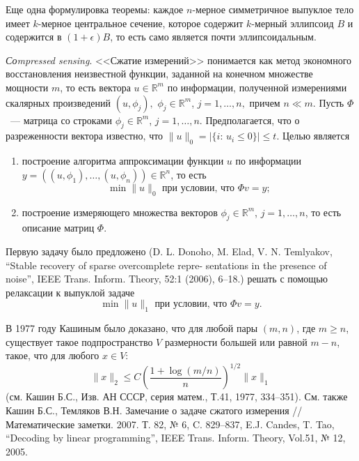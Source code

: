 \begin{remark}
Еще одна формулировка теоремы: каждое $n$-мерное симметричное выпуклое тело имеет $k$-мерное центральное сечение, которое содержит $k$-мерный эллипсоид $B$ и содержится в $(1+\epsilon)B$, то есть само является почти эллипсоидальным.

\medskip

\textit{Соmpressed sensing}. 
<<Сжатие измерений>> понимается как метод экономного восстановления неизвестной функции, заданной на конечном множестве мощности $m$, то есть вектора $u\in\mathbb{R}^m$ по информации, полученной измерениями скалярных произведений $(u,\phi_j),$ $\phi_j\in \mathbb{R}^m$,  $j = 1,\dots,n,$ причем $n\ll m$. Пусть $\Phi$~--- матрица со строками $\phi_j\in\mathbb{R}^m$, $j=1,\dots,n$.
Предполагается, что о разреженности вектора известно, что $\|u\|_{0} = |\{i:\,u_i\leq 0 \}|\leq t.$
Целью является 
\begin{enumerate}
\item построение алгоритма аппроксимации функции $u$ по информации $y = ((u,\phi_1),\dots,(u,\phi_n))\in\mathbb{R}^n$, то есть 
\begin{equation*}\label{lo-pr}
\min\|u\|_{0}\text{ при условии, что } \Phi v = y;
\end{equation*}
\item построение измеряющего множества векторов $\phi_j\in\mathbb{R}^m$, $j=1,\dots,n$, то есть описание матриц $\Phi$.
\end{enumerate}

Первую задачу было предложено (D. L. Donoho, M. Elad, V. N. Temlyakov, “Stable recovery of sparse overcomplete repre- sentations in the presence of noise”, IEEE Trans. Inform. Theory, 52:1 (2006), 6–18.) решать с помощью релаксации к выпуклой задаче 
\begin{equation*}\label{l1-pr}
\min\|u\|_{1}\text{ при условии, что } \Phi v = y.
\end{equation*}

В 1977 году Кашиным было доказано, что для любой пары  $(m,n)$, где $m\geq n$, существует такое подпространство $V$ размерности большей или равной $m-n$, такое, что для любого $x\in V$:
$$
\|x\|_{2}\leq C \left(\frac{1+\log(m/n)}{n}\right)^{1/2} \|x\|_1 
$$
(см. Кашин Б.С., Изв. АН СССР, серия матем., Т.41, 1977, 334–351). 
См. также Кашин Б.С., Темляков В.Н. Замечание о задаче сжатого измерения // Математические заметки. 2007. Т. 82, № 6, C. 829–837, E.J. Candes, T. Tao, “Decoding by linear programming”, IEEE Trans. Inform. Theory, Vol.51, № 12, 2005.

\end{remark}






